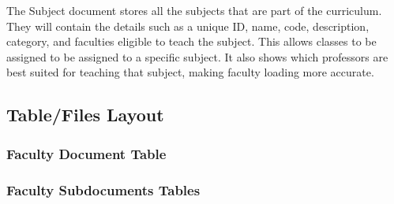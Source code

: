 The Subject document stores all the subjects that are part of the curriculum. They will contain the details such as a unique ID, name, code, description, category, and faculties eligible to teach the subject. This allows classes to be assigned to be assigned to a specific subject. It also shows which professors are best suited for teaching that subject, making faculty loading more accurate.


\subsection{Table/Files Layout}

\subsubsection{Faculty Document Table}

\pagebreak

\subsubsection{Faculty Subdocuments Tables}

